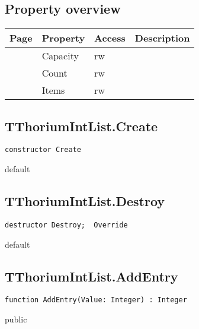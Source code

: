 \subsection{Property overview}
\label{thoriumcorepkg:thorium:tthoriumintlist:properties}
\begin{tabularx}{\textwidth}{lllX}
Page & Property & Access & Description \\ \hline
\pageref{thoriumcorepkg:thorium:tthoriumintlist:capacity} & Capacity & rw &  \\
\pageref{thoriumcorepkg:thorium:tthoriumintlist:count} & Count & rw &  \\
\pageref{thoriumcorepkg:thorium:tthoriumintlist:items} & Items & rw &  \\
\hline
\end{tabularx}
\subsection{TThoriumIntList.Create}
\label{thoriumcorepkg:thorium:tthoriumintlist:create}
\begin{FPCList}
\Declaration 

\begin{verbatim}
constructor Create
\end{verbatim}
\Visibility
default
\end{FPCList}
\subsection{TThoriumIntList.Destroy}
\label{thoriumcorepkg:thorium:tthoriumintlist:destroy}
\begin{FPCList}
\Declaration 

\begin{verbatim}
destructor Destroy;  Override
\end{verbatim}
\Visibility
default
\end{FPCList}
\subsection{TThoriumIntList.AddEntry}
\label{thoriumcorepkg:thorium:tthoriumintlist:addentry}
\begin{FPCList}
\Declaration 

\begin{verbatim}
function AddEntry(Value: Integer) : Integer
\end{verbatim}
\Visibility
public
\end{FPCList}
